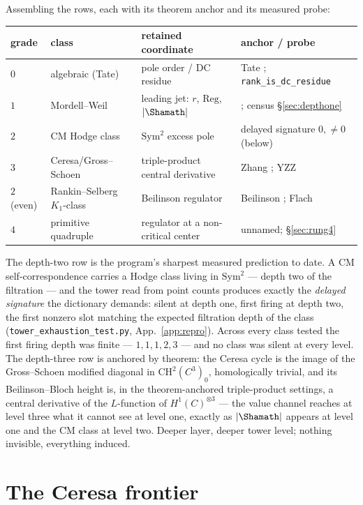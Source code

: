 \documentclass[11pt]{article}
\theoremstyle{definition}
\theoremstyle{remark}
\newcommand{\CH}{\mathrm{CH}}
\begin{document}
Assembling the rows, each with its theorem anchor and its measured probe:

\begin{center}
\begin{tabular}{@{}llll@{}}
\toprule
grade & class & retained coordinate & anchor / probe \\
\midrule
$0$ & algebraic (Tate) & pole order / DC residue & Tate \cite{TateConj}; \texttt{rank\_is\_dc\_residue} \\
$1$ & Mordell--Weil & leading jet: $r$, $\mathrm{Reg}$, $|\Shamath|$ & \cite{BSD,GrossZagier,Kolyvagin}; census \S\ref{sec:depthone} \\
$2$ & CM Hodge class & $\mathrm{Sym}^2$ excess pole & delayed signature $0,\neq0$ (below) \\
$3$ & Ceresa/Gross--Schoen & triple-product central derivative & Zhang \cite{ZhangGS}; YZZ \cite{YZZ} \\
$2$ (even) & Rankin--Selberg $K_1$-class & Beilinson regulator & Beilinson \cite{Beilinson}; Flach \cite{Flach} \\
$4$ & primitive quadruple & regulator at a non-critical center & unnamed; \S\ref{sec:rung4} \\
\bottomrule
\end{tabular}
\end{center}

The depth-two row is the program's sharpest measured prediction to date. A CM
self-correspondence carries a Hodge class living in $\mathrm{Sym}^2$ --- depth
two of the filtration --- and the tower read from point counts produces exactly
the \emph{delayed signature} the dictionary demands: silent at depth one, first
firing at depth two, the first nonzero slot matching the expected filtration
depth of the class (\texttt{tower\_exhaustion\_test.py},
App.~\ref{app:repro}). Across every class tested the first firing depth was
finite --- $1,1,1,2,3$ --- and no class was silent at every level. The
depth-three row is anchored by theorem: the Ceresa cycle is the image of the
Gross--Schoen modified diagonal in $\CH^2(C^3)_0$, homologically trivial, and
its Beilinson--Bloch height is, in the theorem-anchored triple-product
settings, a central derivative of the $L$-function of $H^1(C)^{\otimes3}$
\cite{ZhangGS,YZZ} --- the value channel reaches at level three what it cannot
see at level one, exactly as $|\Shamath|$ appears at level one and the CM class
at level two. Deeper layer, deeper tower level; nothing invisible, everything
induced.

\section{The Ceresa frontier}\label{sec:ceresa}
\end{document}
